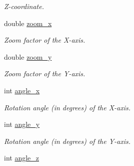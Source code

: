\begin{DoxyCompactItemize}
\begin{DoxyCompactList}\small\item\em Z-\/coordinate. \item\end{DoxyCompactList}\item 
\hypertarget{class_f2_c_1_1_sprite_element_a9f7783ca5f37133236bc1ded8762a6af}{
double \hyperlink{class_f2_c_1_1_sprite_element_a9f7783ca5f37133236bc1ded8762a6af}{zoom\_\-x}}
\label{class_f2_c_1_1_sprite_element_a9f7783ca5f37133236bc1ded8762a6af}

\begin{DoxyCompactList}\small\item\em Zoom factor of the X-\/axis. \item\end{DoxyCompactList}\item 
\hypertarget{class_f2_c_1_1_sprite_element_a5286a8cc51f4d3b84f74337688194575}{
double \hyperlink{class_f2_c_1_1_sprite_element_a5286a8cc51f4d3b84f74337688194575}{zoom\_\-y}}
\label{class_f2_c_1_1_sprite_element_a5286a8cc51f4d3b84f74337688194575}

\begin{DoxyCompactList}\small\item\em Zoom factor of the Y-\/axis. \item\end{DoxyCompactList}\item 
\hypertarget{class_f2_c_1_1_sprite_element_a6ce4f75f404b3b91432b94460018bc89}{
int \hyperlink{class_f2_c_1_1_sprite_element_a6ce4f75f404b3b91432b94460018bc89}{angle\_\-x}}
\label{class_f2_c_1_1_sprite_element_a6ce4f75f404b3b91432b94460018bc89}

\begin{DoxyCompactList}\small\item\em Rotation angle (in degrees) of the X-\/axis. \item\end{DoxyCompactList}\item 
\hypertarget{class_f2_c_1_1_sprite_element_aaf137ef6abf1957f6143cc6279beec20}{
int \hyperlink{class_f2_c_1_1_sprite_element_aaf137ef6abf1957f6143cc6279beec20}{angle\_\-y}}
\label{class_f2_c_1_1_sprite_element_aaf137ef6abf1957f6143cc6279beec20}

\begin{DoxyCompactList}\small\item\em Rotation angle (in degrees) of the Y-\/axis. \item\end{DoxyCompactList}\item 
\hypertarget{class_f2_c_1_1_sprite_element_a3e66451eaf40b750a8e5df05003adba6}{
int \hyperlink{class_f2_c_1_1_sprite_element_a3e66451eaf40b750a8e5df05003adba6}{angle\_\-z}}
\label{class_f2_c_1_1_sprite_element_a3e66451eaf40b750a8e5df05003adba6}


\end{DoxyCompactItemize}
